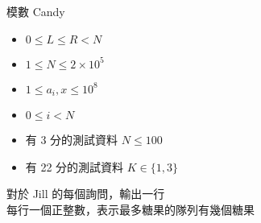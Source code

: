 \begin{problem}{模數 Candy}
\begin{iofmt}
\begin{itemize}
	\item $0 \leq L \leq R < N$
	\item $1 \leq N \leq 2\times 10^5$ %
    \item $1 \leq a_i, x \leq 10^8$
    \item $0 \leq i < N$
	\item 有 3 分的測試資料 $N \leq 100$
	\item 有 22 分的測試資料 $K \in \{1,3\}$
\end{itemize}
\end{iofmt}

\OutputFile

對於 Jill 的每個詢問，輸出一行\\
每行一個正整數，表示最多糖果的隊列有幾個糖果

\Examples

\begin{example}
\end{example}

\end{problem}
